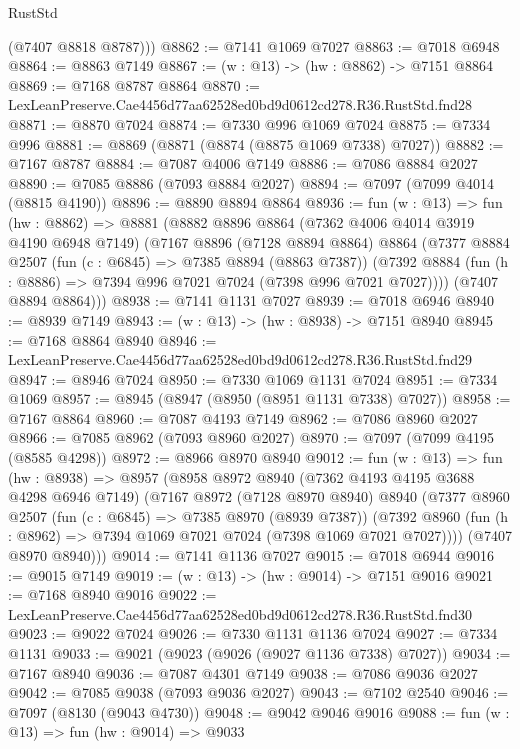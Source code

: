 \begin{lexlean}{RustStd}
\begin{coremodule}
        (@7407 @8818 @8787)))
@8862 := @7141 @1069 @7027
@8863 := @7018 @6948
@8864 := @8863 @7149
@8867 := (w : @13) -> (hw : @8862) -> @7151 @8864
@8869 := @7168 @8787 @8864
@8870 := LexLeanPreserve.Cae4456d77aa62528ed0bd9d0612cd278.R36.RustStd.fnd28
@8871 := @8870 @7024
@8874 := @7330 @996 @1069 @7024
@8875 := @7334 @996
@8881 := @8869 (@8871 (@8874 (@8875 @1069 @7338) @7027))
@8882 := @7167 @8787
@8884 := @7087 @4006 @7149
@8886 := @7086 @8884 @2027
@8890 := @7085 @8886 (@7093 @8884 @2027)
@8894 := @7097 (@7099 @4014 (@8815 @4190))
@8896 := @8890 @8894 @8864
@8936 := fun (w : @13) =>
  fun (hw : @8862) =>
  @8881
    (@8882
      @8896
      @8864
      (@7362 @4006 @4014 @3919 @4190 @6948 @7149)
      (@7167
        @8896
        (@7128 @8894 @8864)
        @8864
        (@7377
          @8884
          @2507
          (fun (c : @6845) => @7385 @8894 (@8863 @7387))
          (@7392 @8884 (fun (h : @8886) => @7394 @996 @7021 @7024 (@7398 @996 @7021 @7027))))
        (@7407 @8894 @8864)))
@8938 := @7141 @1131 @7027
@8939 := @7018 @6946
@8940 := @8939 @7149
@8943 := (w : @13) -> (hw : @8938) -> @7151 @8940
@8945 := @7168 @8864 @8940
@8946 := LexLeanPreserve.Cae4456d77aa62528ed0bd9d0612cd278.R36.RustStd.fnd29
@8947 := @8946 @7024
@8950 := @7330 @1069 @1131 @7024
@8951 := @7334 @1069
@8957 := @8945 (@8947 (@8950 (@8951 @1131 @7338) @7027))
@8958 := @7167 @8864
@8960 := @7087 @4193 @7149
@8962 := @7086 @8960 @2027
@8966 := @7085 @8962 (@7093 @8960 @2027)
@8970 := @7097 (@7099 @4195 (@8585 @4298))
@8972 := @8966 @8970 @8940
@9012 := fun (w : @13) =>
  fun (hw : @8938) =>
  @8957
    (@8958
      @8972
      @8940
      (@7362 @4193 @4195 @3688 @4298 @6946 @7149)
      (@7167
        @8972
        (@7128 @8970 @8940)
        @8940
        (@7377
          @8960
          @2507
          (fun (c : @6845) => @7385 @8970 (@8939 @7387))
          (@7392 @8960 (fun (h : @8962) => @7394 @1069 @7021 @7024 (@7398 @1069 @7021 @7027))))
        (@7407 @8970 @8940)))
@9014 := @7141 @1136 @7027
@9015 := @7018 @6944
@9016 := @9015 @7149
@9019 := (w : @13) -> (hw : @9014) -> @7151 @9016
@9021 := @7168 @8940 @9016
@9022 := LexLeanPreserve.Cae4456d77aa62528ed0bd9d0612cd278.R36.RustStd.fnd30
@9023 := @9022 @7024
@9026 := @7330 @1131 @1136 @7024
@9027 := @7334 @1131
@9033 := @9021 (@9023 (@9026 (@9027 @1136 @7338) @7027))
@9034 := @7167 @8940
@9036 := @7087 @4301 @7149
@9038 := @7086 @9036 @2027
@9042 := @7085 @9038 (@7093 @9036 @2027)
@9043 := @7102 @2540
@9046 := @7097 (@8130 (@9043 @4730))
@9048 := @9042 @9046 @9016
@9088 := fun (w : @13) =>
  fun (hw : @9014) =>
  @9033

\end{coremodule}
\end{lexlean}
